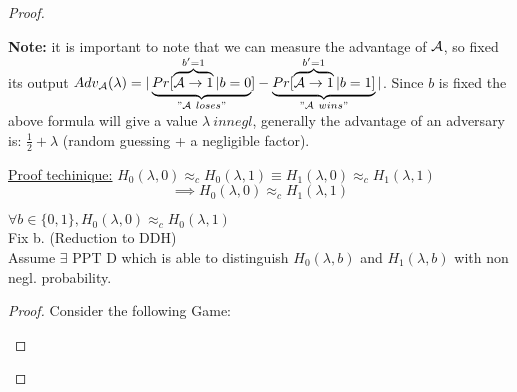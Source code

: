 \begin{proof}
\begin{figure}[h]
    \end{figure}

    \textbf{Note:} it is important to note that we can measure the advantage of $\mathcal{A}$, so fixed its output $Adv_{\A}(\lambda) = |\underbrace{Pr[\overbrace{\A\rightarrow 1}^{b'=1}|b=0}_{"\A\ loses"}]-\underbrace{Pr[\overbrace{\A\rightarrow 1}^{b'=1}|b=1]}_{"\A\ wins"}|$. Since $b$ is fixed the above formula will give a value $\lambda \ in negl$, generally the advantage of an adversary is: $\frac{1}{2}+\lambda$ (random guessing + a negligible factor). %

    

    \underline{Proof techinique:}
    $H_0(\lambda,0) \approx_c H_0(\lambda,1)\equiv H_1(\lambda,0) \approx_c H_1(\lambda,1)$
    $$\implies H_0(\lambda,0) \approx_c H_1(\lambda,1)$$

    \begin{lemma}
        $\forall b \in \{0,1\}, H_0(\lambda,0) \approx_c H_0(\lambda,1)$\\
        Fix b. (Reduction to DDH)\\
        Assume $\exists$ PPT D which is able to distinguish $H_0(\lambda,b)$ and $H_1(\lambda,b)$ with non negl. probability.
    \end{lemma}

    \begin{proof}

        Consider the following Game:

        \begin{figure}[h!]
            \centering
            \sdinit{}
\end{figure}
\end{proof}
\end{proof}

